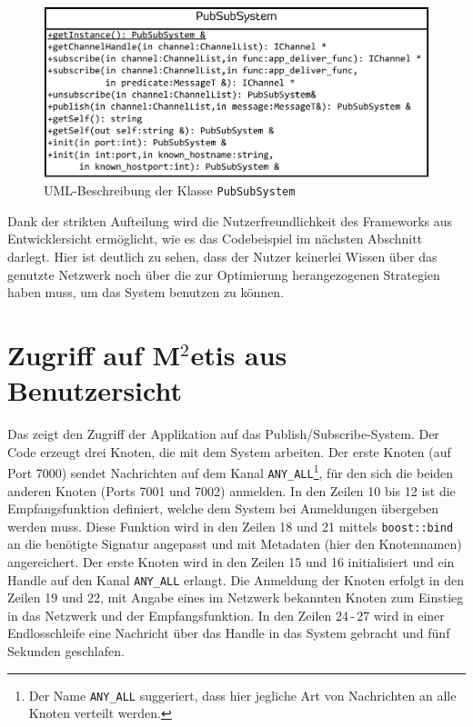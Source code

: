 \begin{figure}[htbp]
\centering
\includegraphics{grafics/uml_pubsubsystem.pdf}
\caption{UML-Beschreibung der Klasse \texttt{PubSubSystem}}
\label{fig:uml_pubsubsystem}
\end{figure}

Dank der strikten Aufteilung wird die Nutzerfreundlichkeit des Frameworks aus Entwicklersicht ermöglicht, wie es das Codebeispiel im nächsten Abschnitt darlegt. Hier ist deutlich zu sehen, dass der Nutzer keinerlei Wissen über das genutzte Netzwerk noch über die zur Optimierung herangezogenen Strategien haben muss, um das System benutzen zu können.

\section{Zugriff auf M$^2$etis aus Benutzersicht}
Das  zeigt den Zugriff der Applikation auf das Publish/Subscribe-System. Der Code erzeugt drei Knoten, die mit dem System arbeiten. Der erste Knoten (auf Port 7000) sendet Nachrichten auf dem Kanal \texttt{ANY\_ALL}\footnote{Der Name \texttt{ANY\_ALL} suggeriert, dass hier jegliche Art von Nachrichten an alle Knoten verteilt werden.}, für den sich die beiden anderen Knoten (Ports 7001 und 7002) anmelden. In den Zeilen 10 bis 12 ist die Empfangsfunktion definiert, welche dem System bei Anmeldungen übergeben werden muss. Diese Funktion wird in den Zeilen 18 und 21 mittels \texttt{boost::bind} an die benötigte Signatur angepasst und mit Metadaten (hier den Knotennamen) angereichert. Der erste Knoten wird in den Zeilen 15 und 16 initialisiert und ein Handle auf den Kanal \texttt{ANY\_ALL} erlangt. Die Anmeldung der Knoten erfolgt in den Zeilen 19 und 22, mit Angabe eines im Netzwerk bekannten Knoten zum Einstieg in das Netzwerk und der Empfangsfunktion. In den Zeilen 24\,-\,27 wird in einer Endlosschleife eine Nachricht über das Handle in das System gebracht und fünf Sekunden geschlafen.


